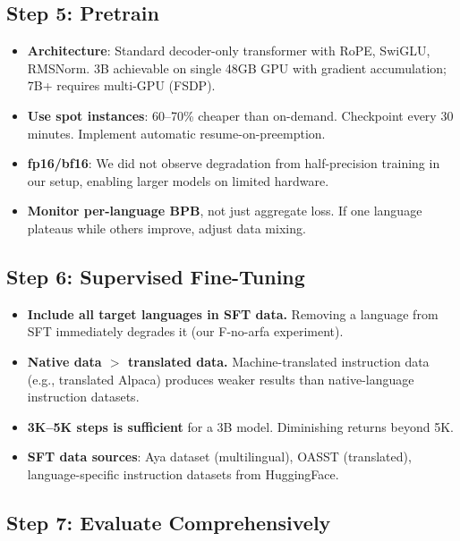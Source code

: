 \documentclass[10pt,twocolumn]{article}
\begin{document}
\subsection{Step 5: Pretrain}

\begin{itemize}
    \item \textbf{Architecture}: Standard decoder-only transformer with RoPE, SwiGLU, RMSNorm. 3B achievable on single 48GB GPU with gradient accumulation; 7B+ requires multi-GPU (FSDP).
    \item \textbf{Use spot instances}: 60--70\% cheaper than on-demand. Checkpoint every 30 minutes. Implement automatic resume-on-preemption.
    \item \textbf{fp16/bf16}: We did not observe degradation from half-precision training in our setup, enabling larger models on limited hardware.
    \item \textbf{Monitor per-language BPB}, not just aggregate loss. If one language plateaus while others improve, adjust data mixing.
\end{itemize}

\subsection{Step 6: Supervised Fine-Tuning}

\begin{itemize}
    \item \textbf{Include all target languages in SFT data.} Removing a language from SFT immediately degrades it (our F-no-arfa experiment).
    \item \textbf{Native data $>$ translated data.} Machine-translated instruction data (e.g., translated Alpaca) produces weaker results than native-language instruction datasets.
    \item \textbf{3K--5K steps is sufficient} for a 3B model. Diminishing returns beyond 5K.
    \item \textbf{SFT data sources}: Aya dataset (multilingual), OASST (translated), language-specific instruction datasets from HuggingFace.
\end{itemize}

\subsection{Step 7: Evaluate Comprehensively}
\end{document}
